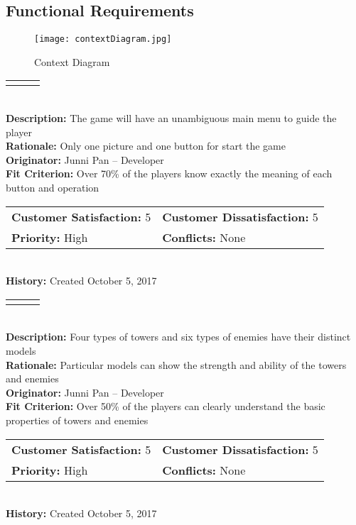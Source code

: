 \documentclass[12pt]{article}
\begin{document}
\newpage
\subsection{Functional Requirements}

\begin{figure}[htp]
\centering
\texttt{[image: contextDiagram.jpg]}
\caption{Context Diagram}
\label{fig:contextDiagram}
\end{figure}

\begin{reqbox}
\begin{tabular}{ccc}\color{red}{Requirement: FR01}
\end{tabular} \\
\textbf{Description:} The game will have an unambiguous main menu to guide the player\\
\textbf{Rationale:} Only one picture and one button for start the game\\
\textbf{Originator:} Junni Pan -- Developer \\
\textbf{Fit Criterion:} Over 70\% of the players know exactly the meaning of each button and operation\\
\begin{tabular}{ll}
\textbf{Customer Satisfaction:} 5 & \textbf{Customer Dissatisfaction:} 5 \\
\textbf{Priority:} High & \textbf{Conflicts:} None\\
\end{tabular} \\
\textbf{History:} Created October 5, 2017
\end{reqbox}


\begin{reqbox}
\begin{tabular}{ccc}\color{red}{Requirement: FR02}
\end{tabular} \\
\textbf{Description:} Four types of towers and six types of enemies have their distinct models\\
\textbf{Rationale:} Particular models can show the strength and ability of the towers and enemies\\
\textbf{Originator:} Junni Pan -- Developer \\
\textbf{Fit Criterion:} Over 50\% of the players can clearly understand the basic properties of towers and enemies\\
\begin{tabular}{ll}
\textbf{Customer Satisfaction:} 5 & \textbf{Customer Dissatisfaction:} 5 \\
\textbf{Priority:} High & \textbf{Conflicts:} None\\
\end{tabular} \\
\textbf{History:} Created October 5, 2017
\end{reqbox}
\end{document}
